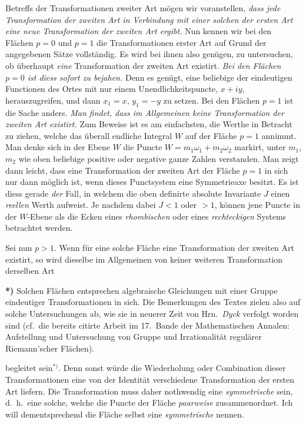 \documentclass{article}
\begin{document}
Betreffs der Transformationen zweiter Art mögen wir voranstellen, \emph{dass jede Transformation der zweiten Art in Verbindung mit einer solchen der ersten Art eine neue Transformation der zweiten Art ergibt.} Nun kennen wir bei den Flächen $p = 0$ und $p = 1$ die Transformationen erster Art auf Grund der angegebenen Sätze vollständig. Es wird bei ihnen also genügen, zu untersuchen, ob überhaupt \emph{eine} Transformation der zweiten Art existirt. \emph{Bei den Flächen $p = 0$ ist diess sofort zu bejahen.} Denn es genügt, eine beliebige der eindeutigen Functionen des Ortes mit nur einem Unendlichkeitspuncte, $x + iy$, herauszugreifen, und dann $x_{1} = x$, $y_{1} = - y$ zu setzen. Bei den Flächen $p = 1$ ist die Sache anders. \emph{Man findet, dass im Allgemeinen keine Transformation der zweiten Art existirt.} Zum Beweise ist es am einfachsten, die Werthe in Betracht zu ziehen, welche das überall endliche Integral $W$ auf der Fläche $p = 1$ annimmt. Man denke sich in der Ebene $W$ die Puncte $W = m_{1}\omega_{1} + m_{2}\omega_{2}$ markirt, unter $m_{1}$, $m_{2}$ wie oben beliebige positive oder negative ganze Zahlen verstanden. Man zeigt dann leicht, dass eine Transformation der zweiten Art der Fläche $p = 1$ in sich nur dann möglich ist, wenn dieses Punctsystem eine Symmetrieaxe besitzt. Es ist diess gerade \emph{der} Fall, in welchem die oben definirte absolute Invariante $J$ einen \emph{reellen} Werth aufweist. Je nachdem dabei $J < 1$ oder $> 1$, können jene Puncte in der $W$-Ebene als die Ecken eines \emph{rhombischen} oder eines \emph{rechteckigen} Systems betrachtet werden.

Sei nun $p > 1$. Wenn für eine solche Fläche eine Transformation der zweiten Art existirt, so wird dieselbe im Allgemeinen von keiner weiteren Transformation derselben Art

\textbf{*)} Solchen Flächen entsprechen algebraische Gleichungen mit einer Gruppe eindeutiger Transformationen in sich. Die Bemerkungen des Textes zielen also auf solche Untersuchungen ab, wie sie in neuerer Zeit von Hrn.\ \emph{Dyck} verfolgt worden sind (cf.\ die bereits citirte Arbeit im 17.\ Bande der Mathematischen Annalen: Aufstellung und Untersuchung von Gruppe und Irrationalität regulärer Riemann'scher Flächen).

begleitet sein${}^{*)}$. Denn sonst würde die Wiederholung oder Combination dieser Transformationen eine von der Identität verschiedene Transformation der ersten Art liefern. Die Transformation muss daher nothwendig eine \emph{symmetrische} sein, d.\ h.\ eine solche, welche die Puncte der Fläche \emph{paarweise} zusammenordnet. Ich will dementsprechend die Fläche selbst eine \emph{symmetrische} nennen.
\end{document}
